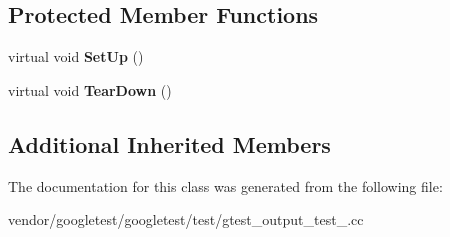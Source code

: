 \subsection*{Protected Member Functions}
\begin{DoxyCompactItemize}
\item 
\mbox{\label{class_non_fatal_failure_in_fixture_constructor_test_a7d951f8fbf7b2ac5046be8d8ee7b03d3}} 
virtual void {\bfseries Set\+Up} ()
\item 
\mbox{\label{class_non_fatal_failure_in_fixture_constructor_test_ab76d79c346d9a378d625fde5739e8ad6}} 
virtual void {\bfseries Tear\+Down} ()
\end{DoxyCompactItemize}
\subsection*{Additional Inherited Members}


The documentation for this class was generated from the following file\+:\begin{DoxyCompactItemize}
\item 
vendor/googletest/googletest/test/gtest\+\_\+output\+\_\+test\+\_\+.\+cc\end{DoxyCompactItemize}
